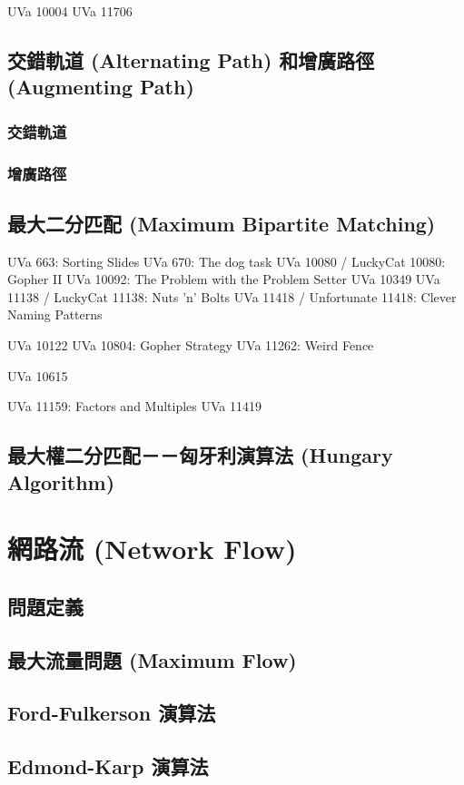 \documentclass[12pt,a4paper,oneside]{report}
\begin{document}
\begin{CJK}{UTF8}{bkai}
UVa 10004
UVa 11706

\subsection{交錯軌道 (Alternating Path) 和增廣路徑 (Augmenting Path)}
\subsubsection{交錯軌道}

\subsubsection{增廣路徑}

\subsection{最大二分匹配 (Maximum Bipartite Matching)}

UVa 663: Sorting Slides
UVa 670: The dog task
UVa 10080 / LuckyCat 10080: Gopher II
UVa 10092: The Problem with the Problem Setter
UVa 10349
UVa 11138 / LuckyCat 11138: Nuts 'n' Bolts
UVa 11418 / Unfortunate 11418: Clever Naming Patterns

UVa 10122
UVa 10804: Gopher Strategy
UVa 11262: Weird Fence

UVa 10615

UVa 11159: Factors and Multiples
UVa 11419

\subsection{最大權二分匹配－－匈牙利演算法 (Hungary Algorithm)}

\section{網路流 (Network Flow)}
\subsection{問題定義}
\subsection{最大流量問題 (Maximum Flow)}
\subsection{Ford-Fulkerson 演算法}
\subsection{Edmond-Karp 演算法}

\end{CJK}
\end{document}
